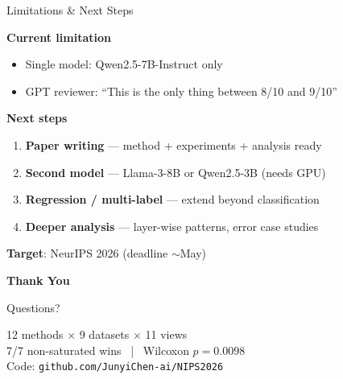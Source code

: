 \documentclass[aspectratio=169,14pt]{beamer}
\begin{document}
\begin{frame}{Limitations \& Next Steps}

\textbf{Current limitation}
\begin{itemize}
    \item Single model: Qwen2.5-7B-Instruct only
    \item {\small GPT reviewer: ``This is the only thing between 8/10 and 9/10''}
\end{itemize}

\vspace{1em}
\textbf{Next steps}
\begin{enumerate}
    \item \textbf{Paper writing} — method + experiments + analysis ready
    \item \textbf{Second model} — Llama-3-8B or Qwen2.5-3B (needs GPU)
    \item \textbf{Regression / multi-label} — extend beyond classification
    \item \textbf{Deeper analysis} — layer-wise patterns, error case studies
\end{enumerate}

\vspace{1em}
\textbf{Target}: NeurIPS 2026 (deadline $\sim$May)

\end{frame}

\begin{frame}{}
\centering
\vspace{2em}
{\Huge\textcolor{primary}{\textbf{Thank You}}}

\vspace{2em}
{\Large Questions?}

\vspace{2em}
{\small
12 methods $\times$ 9 datasets $\times$ 11 views\\[0.3em]
7/7 non-saturated wins \ | \ Wilcoxon $p=0.0098$\\[0.3em]
Code: \texttt{github.com/JunyiChen-ai/NIPS2026}
}
\end{frame}
\end{document}
